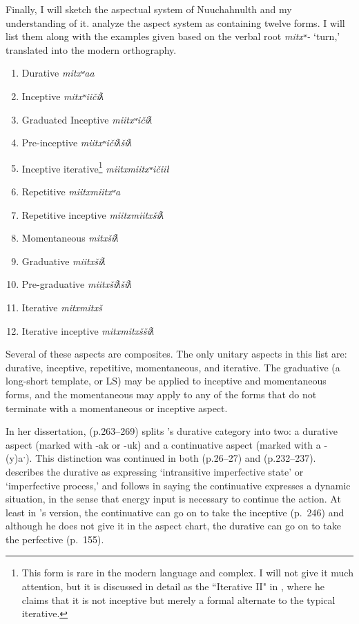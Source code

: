 Finally, I will sketch the aspectual system of Nuuchahnulth and my understanding of it. \cite[240--241]{sapir1939} analyze the aspect system as containing twelve forms. I will list them along with the examples given based on the verbal root \textit{mitxʷ-} `turn,' translated into the modern orthography.

\begin{enumerate}[noitemsep]
\item Durative \textit{mitxʷaa}
\item Inceptive \textit{mitxʷiičiƛ}
\item Graduated Inceptive \textit{miitxʷičiƛ}
\item Pre-inceptive \textit{miitxʷičiƛšiƛ}
\item Inceptive iterative\footnote{This form is rare in the modern language and complex. I will not give it much attention, but it is discussed in detail as the ``Iterative II" in \cite[242--244]{davidson2002}, where he claims that it is not inceptive but merely a formal alternate to the typical iterative.} \textit{miitxmiitxʷičiił}
\item Repetitive \textit{miitxmiitxʷa}
\item Repetitive inceptive \textit{miitxmiitxšiƛ}
\item Momentaneous \textit{mitxšiƛ}
\item Graduative \textit{miitxšiƛ}
\item Pre-graduative \textit{miitxšiƛšiƛ}
\item Iterative \textit{mitxmitxš}
\item Iterative inceptive \textit{mitxmitxššiƛ}
\end{enumerate}

Several of these aspects are composites. The only unitary aspects in this list are: durative, inceptive, repetitive, momentaneous, and iterative. The graduative (a long-short template, or LS) may be applied to inceptive and momentaneous forms, and the momentaneous may apply to any of the forms that do not terminate with a momentaneous or inceptive aspect.

In her dissertation, \citealt{rose1981} (p.263--269) splits \citeauthor{sapir1939}'s durative category into two: a durative aspect (marked with -ak or -uk) and a continuative aspect (marked with a -(y)aˑ). This distinction was continued in both \citealt{nakayama2001} (p.26--27) and \citealt{davidson2002} (p.232--237). \citeauthor{davidson2002} describes the durative as expressing `intransitive imperfective state' or `imperfective process,' and follows \citeauthor{rose1981} in saying the continuative expresses a dynamic situation, in the sense that energy input is necessary to continue the action. At least in \citeauthor{davidson2002}'s version, the continuative can go on to take the inceptive (p.\ 246) and although he does not give it in the aspect chart, the durative can go on to take the perfective (p.\ 155).


